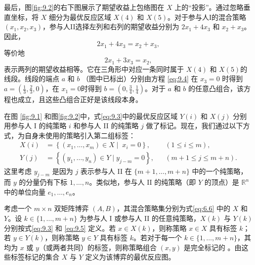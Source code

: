 最后，图\ref{fig:9.2}的右下图展示了期望收益上包络图在 \(X\) 上的“投影”。通过忽略垂直坐标，将 \(X\) 细分为最优反应区域 \(X\left( 4\right)\) 和 \(X\left( 5\right)\)。对于参与人I的混合策略 \(\left( {{x}_{1},{x}_{2},{x}_{3}}\right)\)，参与人II选择左列和右列的期望收益分别为 \(2{x}_{1} + 4{x}_{3}\) 和 \({x}_{2} + {x}_{3}\)。因此，
\[
2{x}_{1} + 4{x}_{3} = {x}_{2} + {x}_{3},
\]
等价地
\begin{equation}\label{eq:9.4}
2 x_1 + 3 x_3 = x_2,
\end{equation}
表示两列的期望收益相等。它在三角形中对应一条同时属于 \(X\left( 4\right)\) 和 \(X\left( 5\right)\)的线段。线段的端点 \(a\) 和 \(b\) （图中已标出）分别由方程 \eqref{eq:9.4} 在 \({x}_{3} = 0\) 时得到 \(a = \left( {\frac{1}{3},\frac{2}{3},0}\right)\)，在 \({x}_{1} = 0\)时得到 \(b = \left( {0,\frac{3}{4},\frac{1}{4}}\right)\)。对于 \(a\) 和 \(b\) 的任意凸组合，该方程也成立，且这些凸组合正好是该线段本身。


在图 \ref{fig:9.1} 和图\ref{fig:9.2}中，式\eqref{eq:9.3}中的最优反应区域 \(Y(i)\) 和 \(X(j)\) 分别用参与人 I 的纯策略 \(i\) 和参与人 II 的纯策略 \(j\) 做了标记。现在，我们通过以下方式，为自身未使用的策略引入第二组标签：
\begin{equation} \label{eq:9.5}
\begin{aligned}
X(i)  &= \left\{  {\left( {{x}_{1},\ldots,{x}_{m}}\right)  \in  X \mid  \;{x}_{i} = 0}\right\},
&& (1 \le i \le m), \\
Y(j) & = \left\{  {\left( {{y}_{1},\ldots,{y}_{n}}\right)  \in  Y \mid  {y}_{j - m} = 0}\right\},
&& (m+1 \le j \le m+n).
\end{aligned}
\end{equation}
这里考虑 \({y}_{j - m}\) 是因为 \(j\) 表示参与人 II 在 \(\{ m + 1,\ldots,m + n\}\) 中的一个纯策略，而 \(y\) 的分量仍有下标 \(1,\ldots,n\)。类似地，参与人 II 的纯策略（即 \(Y\) 的顶点）是 \({\mathbb{R}}^{n}\) 中的单位向量 \({e}_{1},\ldots,{e}_{n}\)。


\begin{definition} \label{def:9.1}  %
考虑一个 $m \times n$ 双矩阵博弈 $(A, B)$，其混合策略集分别为式\eqref{eq:6.6} 中的 $X$ 和 $Y$。设 $k \in \{1, \ldots, m+n\}$ 为参与人 I 或参与人 II 的任意纯策略，$X(k)$ 与 $Y(k)$ 分别按式\eqref{eq:9.3} 和 \eqref{eq:9.5} 定义。若 $x \in X(k)$，则称策略 $x \in X$ 具有{标签} $k$；若 $y \in Y(k)$，则称策略 $y \in Y$ 具有{标签} $k$。若对于每一个 $k \in \{1, \ldots, m+n\}$，其均为 $x$ 或 $y$（或两者共同）的标签，则称策略组合 $(x, y)$ 是{完全标记的 }。由这些标签标记的集合 $X$ 与 $Y$ 定义为该博弈的{最优反应图}。
\end{definition}



